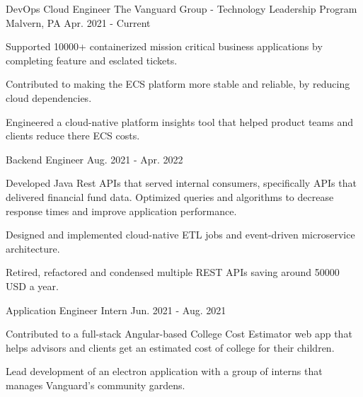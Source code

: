 

\begin{cventries}

  \cventry
    {DevOps Cloud Engineer} %
    {The Vanguard Group - Technology Leadership Program} %
    {Malvern, PA} %
    {Apr. 2021 - Current} %
    {
      \begin{cvitems} %
        \item {Supported 10000+ containerized mission critical business applications by completing feature and esclated tickets.}
        \item {Contributed to making the ECS platform more stable and reliable, by reducing cloud dependencies.}
        \item {Engineered a cloud-native platform insights tool that helped product teams and clients reduce there ECS costs.}
      \end{cvitems}
    }
  \cventry
    {Backend Engineer} %
    {} %
    {} %
    {Aug. 2021 - Apr. 2022} %
    {
      \begin{cvitems} %
        \item {Developed Java Rest APIs that served internal consumers, specifically APIs that delivered financial fund data. Optimized queries and algorithms to decrease response times and improve application performance.}
        \item {Designed and implemented cloud-native ETL jobs and event-driven microservice architecture.}
        \item {Retired, refactored and condensed multiple REST APIs saving around 50000 USD a year.}
      \end{cvitems}
    }

  \cventry
    {Application Engineer Intern} %
    {} %
    {} %
    {Jun. 2021 - Aug. 2021} %
    {
      \begin{cvitems} %
        \item {Contributed to a full-stack Angular-based College Cost Estimator web app that helps advisors and clients get an estimated cost of college for their children.}
        \item {Lead development of an electron application with a group of interns that manages Vanguard's community gardens.}
      \end{cvitems}
    }


\end{cventries}

